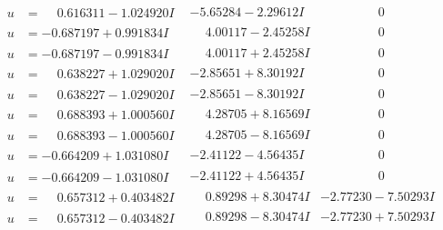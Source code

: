 \documentclass[1p]{elsarticle_modified}
\theoremstyle{definition}
\begin{document}
$$\begin{array}{c|c|c}
\begin{aligned}
u &= \phantom{-}0.616311 - 1.024920 I\end{aligned}
 & -5.65284 - 2.29612 I & \phantom{-0.000000 } 0 \\ \hline\begin{aligned}
u &= -0.687197 + 0.991834 I\end{aligned}
 & \phantom{-}4.00117 - 2.45258 I & \phantom{-0.000000 } 0 \\ \hline\begin{aligned}
u &= -0.687197 - 0.991834 I\end{aligned}
 & \phantom{-}4.00117 + 2.45258 I & \phantom{-0.000000 } 0 \\ \hline\begin{aligned}
u &= \phantom{-}0.638227 + 1.029020 I\end{aligned}
 & -2.85651 + 8.30192 I & \phantom{-0.000000 } 0 \\ \hline\begin{aligned}
u &= \phantom{-}0.638227 - 1.029020 I\end{aligned}
 & -2.85651 - 8.30192 I & \phantom{-0.000000 } 0 \\ \hline\begin{aligned}
u &= \phantom{-}0.688393 + 1.000560 I\end{aligned}
 & \phantom{-}4.28705 + 8.16569 I & \phantom{-0.000000 } 0 \\ \hline\begin{aligned}
u &= \phantom{-}0.688393 - 1.000560 I\end{aligned}
 & \phantom{-}4.28705 - 8.16569 I & \phantom{-0.000000 } 0 \\ \hline\begin{aligned}
u &= -0.664209 + 1.031080 I\end{aligned}
 & -2.41122 - 4.56435 I & \phantom{-0.000000 } 0 \\ \hline\begin{aligned}
u &= -0.664209 - 1.031080 I\end{aligned}
 & -2.41122 + 4.56435 I & \phantom{-0.000000 } 0 \\ \hline\begin{aligned}
u &= \phantom{-}0.657312 + 0.403482 I\end{aligned}
 & \phantom{-}0.89298 + 8.30474 I & -2.77230 - 7.50293 I \\ \hline\begin{aligned}
u &= \phantom{-}0.657312 - 0.403482 I\end{aligned}
 & \phantom{-}0.89298 - 8.30474 I & -2.77230 + 7.50293 I \\ \hline\begin{aligned}

\end{aligned}
\end{array}$$
\end{document}
